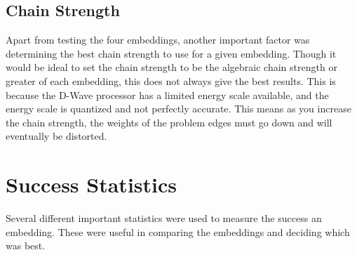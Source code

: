 \documentclass[11pt]{report}
\newcommand{\?}{\stackrel{?}{=}}
\begin{document}
\vspace{10cm}
\subsection{Chain Strength}

Apart from testing the four embeddings, another important factor was determining the best chain strength to use for a given embedding. Though it would be ideal to set the chain strength to be the algebraic chain strength or greater of each embedding, this does not always give the best results. This is because the D-Wave processor has a limited energy scale available, and the energy scale is quantized and not perfectly accurate. This means as you increase the chain strength, the weights of the problem edges must go down and will eventually be distorted.

\section{Success Statistics}
Several different important statistics were used to measure the success an embedding. These were useful in comparing the embeddings and deciding which was best.
\end{document}
